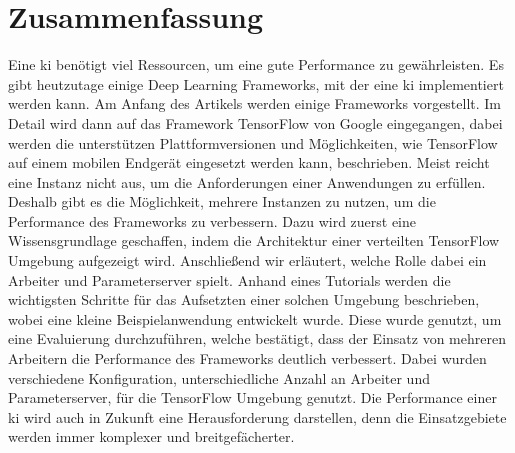 \section{Zusammenfassung}
 Eine \ac{ki} benötigt viel Ressourcen, um eine gute Performance zu gewährleisten. Es gibt heutzutage einige Deep Learning Frameworks, mit der eine \ac{ki} implementiert werden kann. Am Anfang des Artikels werden einige Frameworks vorgestellt. Im Detail wird dann auf das Framework TensorFlow von
 Google eingegangen, dabei werden die unterstützen Plattformversionen und Möglichkeiten, wie TensorFlow auf einem mobilen Endgerät eingesetzt werden kann, beschrieben. Meist reicht eine Instanz nicht aus, um die Anforderungen einer Anwendungen zu erfüllen. Deshalb gibt es die Möglichkeit, mehrere Instanzen zu nutzen, um die Performance des Frameworks zu verbessern. Dazu wird zuerst eine Wissensgrundlage geschaffen, indem die Architektur einer verteilten TensorFlow Umgebung aufgezeigt wird. Anschließend wir erläutert, welche Rolle dabei ein Arbeiter und Parameterserver spielt. Anhand eines Tutorials werden die wichtigsten Schritte für das Aufsetzten einer solchen Umgebung beschrieben, wobei eine kleine Beispielanwendung entwickelt wurde. Diese wurde genutzt, um eine Evaluierung durchzuführen, welche bestätigt, dass der Einsatz von mehreren
 Arbeitern die Performance des Frameworks deutlich verbessert. Dabei wurden verschiedene Konfiguration, unterschiedliche Anzahl an Arbeiter und Parameterserver, für die TensorFlow Umgebung genutzt. Die Performance einer \ac{ki} wird auch in Zukunft eine Herausforderung darstellen, denn die Einsatzgebiete werden immer komplexer und breitgefächerter.  
